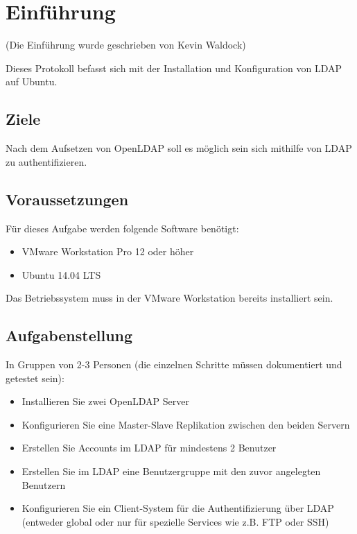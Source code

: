 
\section{Einführung}
(Die Einführung wurde geschrieben von Kevin Waldock)

Dieses Protokoll befasst sich mit der Installation und Konfiguration von LDAP auf Ubuntu. 

\subsection{Ziele}
Nach dem Aufsetzen von OpenLDAP soll es möglich sein sich mithilfe von LDAP zu authentifizieren.

\subsection{Voraussetzungen}
Für dieses Aufgabe werden folgende Software benötigt:

\begin{itemize}
	\item VMware Workstation Pro 12 oder höher
	\item Ubuntu 14.04 LTS
\end{itemize}

Das Betriebssystem muss in der VMware Workstation bereits installiert sein.

\subsection{Aufgabenstellung}

In Gruppen von 2-3 Personen (die einzelnen Schritte müssen dokumentiert und getestet sein):

\begin{itemize}
	\item Installieren Sie zwei OpenLDAP Server
	\item Konfigurieren Sie eine Master-Slave Replikation zwischen den beiden Servern
	\item Erstellen Sie Accounts im LDAP für mindestens 2 Benutzer
	\item Erstellen Sie im LDAP eine Benutzergruppe mit den zuvor angelegten Benutzern
	\item Konfigurieren Sie ein Client-System für die Authentifizierung über LDAP  (entweder global oder nur für spezielle Services wie z.B. FTP oder SSH)
\end{itemize}

\clearpage
